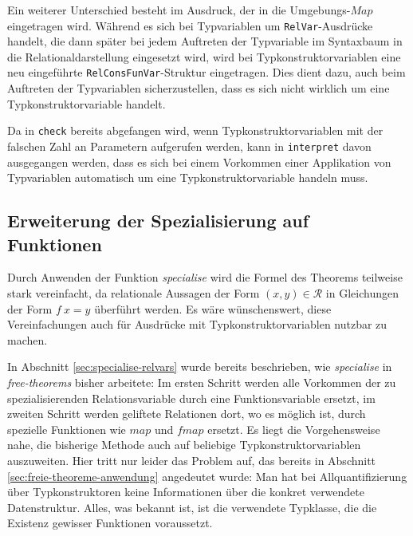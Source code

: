 Ein weiterer Unterschied besteht im Ausdruck, der in die Umgebungs-$Map$ eingetragen wird. Während es sich bei
Typvariablen um \texttt{RelVar}-Ausdrücke handelt, die dann später bei jedem Auftreten der Typvariable im Syntaxbaum
in die Relationaldarstellung eingesetzt wird, wird bei Typkonstruktorvariablen eine neu eingeführte
\texttt{RelConsFunVar}-Struktur eingetragen.
Dies dient dazu, auch beim Auftreten der Typvariablen sicherzustellen, dass es sich nicht wirklich um eine
Typkonstruktorvariable handelt.

Da in \texttt{check} bereits abgefangen wird, wenn Typkonstruktorvariablen mit der falschen Zahl an Parametern aufgerufen
werden, kann in \texttt{interpret} davon ausgegangen werden, dass es sich bei einem Vorkommen einer
Applikation von Typvariablen automatisch um eine Typkonstruktorvariable handeln muss.



\subsection{Erweiterung der Spezialisierung auf Funktionen}

Durch Anwenden der Funktion \textit{specialise} wird die Formel des Theorems teilweise stark vereinfacht, da relationale
Aussagen der Form $(x, y) \in \mathcal{R}$ in Gleichungen der Form $f\ x = y$ überführt werden. Es wäre wünschenswert,
diese Vereinfachungen auch für Ausdrücke mit Typkonstruktorvariablen nutzbar zu machen.

In Abschnitt \ref{sec:specialise-relvars} wurde bereits beschrieben, wie \textit{specialise} in \textit{free-theorems} bisher arbeitete:
Im ersten Schritt werden alle Vorkommen der zu spezialisierenden Relationsvariable durch eine Funktionsvariable ersetzt,
im zweiten Schritt werden geliftete Relationen dort, wo es möglich ist, durch spezielle Funktionen wie $map$ und $fmap$ ersetzt.
Es liegt die Vorgehensweise nahe, die bisherige Methode auch auf beliebige Typkonstruktorvariablen auszuweiten. Hier tritt nur leider
das Problem auf, das bereits in Abschnitt \ref{sec:freie-theoreme-anwendung} angedeutet wurde: Man hat bei Allquantifizierung
über Typkonstruktoren keine Informationen über die konkret verwendete
Datenstruktur. Alles, was bekannt ist, ist die verwendete Typklasse, die die Existenz gewisser Funktionen voraussetzt.

